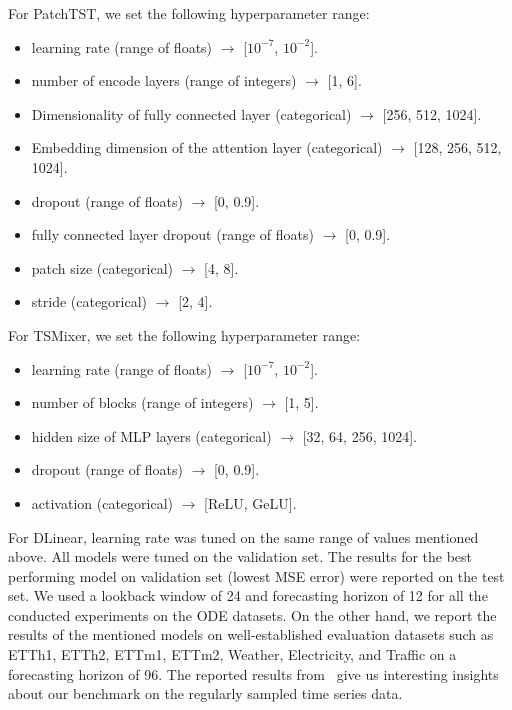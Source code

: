 For PatchTST, we set the following hyperparameter range:

\begin{itemize}
	
	\item learning rate (range of floats) $\rightarrow$ [$10^{-7}$, $10^{-2}$].
	\item number of encode layers (range of integers) $\rightarrow$ [1, 6].
	\item Dimensionality of fully connected layer (categorical) $\rightarrow$ [256, 512, 1024].
	\item Embedding dimension of the attention layer (categorical) $\rightarrow$ [128, 256, 512, 1024].
	\item dropout (range of floats) $\rightarrow$ [0, 0.9].
	\item fully connected layer dropout (range of floats) $\rightarrow$ [0, 0.9].
	\item patch size (categorical) $\rightarrow$ [4, 8].
	\item stride (categorical) $\rightarrow$ [2, 4].
\end{itemize}

For TSMixer, we set the following hyperparameter range: 


\begin{itemize}
	
	\item learning rate (range of floats) $\rightarrow$ [$10^{-7}$, $10^{-2}$].
	\item number of blocks (range of integers) $\rightarrow$ [1, 5].
	\item hidden size of MLP layers (categorical) $\rightarrow$ [32, 64, 256, 1024].
	\item dropout (range of floats) $\rightarrow$ [0, 0.9].
	\item activation (categorical) $\rightarrow$ [ReLU, GeLU].
	
\end{itemize}

For DLinear, learning rate was tuned on the same range of values mentioned above.
All models were tuned on the validation set. 
The results for the best performing model on validation set (lowest MSE error) were reported on the test set.
We used a lookback window of 24 and forecasting horizon of 12 for all the conducted experiments on the ODE datasets.
On the other hand, we report the results of the mentioned models on  well-established evaluation datasets such as ETTh1, ETTh2, ETTm1, ETTm2, Weather, Electricity, and Traffic on a forecasting horizon of 96. 
The reported results from~ give us interesting insights about our benchmark on the regularly sampled time series data.


